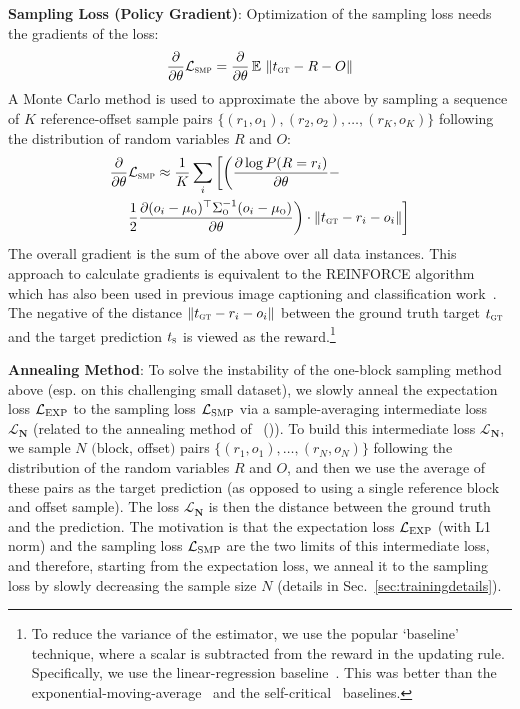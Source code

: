 \documentclass[letterpaper]{article} %
\newcommand{\newcite}[1]{\citeauthor{#1} (\citeyear{#1})}
\DeclareMathOperator{\E}{\mathbb{E}\,}
\begin{document}
\textbf{Sampling Loss (Policy Gradient)}:
Optimization of the sampling loss needs the gradients of the loss:
\begin{align}
\frac{\partial}{\partial \theta} \mathcal{L}_\textsc{smp} = \frac{\partial}{\partial \theta} \E \left \Vert t_\textsc{gt} - R - O \right \Vert 
\end{align}
A Monte Carlo method is used to approximate the above by sampling a sequence of $K$ reference-offset sample pairs
$\{(r_1, o_1), (r_2, o_2), \ldots, (r_K, o_K)\}$
following the distribution of random variables $R$ and $O$:
\begin{align}
\frac{\partial}{\partial \theta} &\mathcal{L}_\textsc{smp} \approx \frac{1}{K} \sum_i\bigg[\bigg(\frac{\partial \log P(R = r_i)}{\partial \theta} - \nonumber \\
&\frac{1}{2}\frac{\partial (o_i-\mu_\textsc{o})^{\top}\Sigma_\textsc{o}^{-1}(o_i-\mu_\textsc{o})}{\partial \theta}\bigg) \cdot \Vert t_\textsc{gt} - r_i - o_i \Vert \bigg]
\end{align}
The overall gradient is the sum of the above over all data instances. This approach to calculate gradients is equivalent to the REINFORCE algorithm~\cite{williams1992simple}
which has also been used in previous image captioning and classification work~\cite{xu2015show,mnih2014recurrent}.
The negative of the distance $\Vert t_\textsc{gt} - r_i - o_i \Vert$ between the ground truth target $t_\textsc{gt}$ and the target prediction $t_\textsc{s}$ is viewed as the reward.\footnote{To reduce the variance of the estimator, we use the popular `baseline' technique, where a scalar is subtracted from the reward in the updating rule. Specifically, we use the linear-regression baseline~\cite{williams1992simple,ranzato2015sequence}. This was better than the exponential-moving-average~\cite{williams1992simple} and the self-critical~\cite{Rennie2016self} baselines.
} 

\textbf{Annealing Method}:
To solve the instability of the one-block sampling method above (esp. on this challenging small dataset), we slowly anneal the expectation loss $\mathcal{L}_\textsc{EXP}$ to the sampling loss $\mathcal{L}_\textsc{SMP}$ via a sample-averaging intermediate loss $\mathcal{L}_\mathbf{N}$ (related to the annealing method of~\newcite{ranzato2015sequence}).
%
To build this intermediate loss $\mathcal{L}_\mathbf{N}$, we sample $N$ $($block, offset$)$ pairs $\{(r_1, o_1), \ldots, (r_N, o_N)\}$ following the distribution of the random variables $R$ and $O$, and then we use the average of these pairs as the target prediction (as opposed to using a single reference block and offset sample). The loss $\mathcal{L}_\mathbf{N}$ is then the distance between the ground truth and the prediction.
The motivation is that the expectation loss $\mathcal{L}_{\textsc{EXP}}$ (with L1 norm) and the sampling loss $\mathcal{L}_{\textsc{SMP}}$ are the two limits of this intermediate loss, 
and therefore, starting from the expectation loss, we anneal it to the sampling loss by slowly decreasing the sample size $N$ (details in Sec.~\ref{sec:trainingdetails}).
\end{document}
